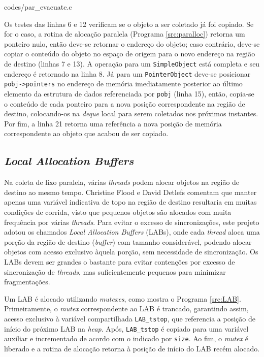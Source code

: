 \documentclass[ccc, pg2]{esinucpel}
\begin{document}

								 {codes/par_evacuate.c}

Os testes das linhas 6 e 12 verificam se o objeto a ser coletado já foi copiado. Se for o caso, a rotina de alocação paralela (Programa \ref{src:paralloc}) retorna um ponteiro nulo, então deve-se retornar o endereço do objeto; caso contrário, deve-se copiar o conteúdo do objeto no espaço de origem para o novo endereço na região de destino (linhas 7 e 13). A operação para um {\tt SimpleObject} está completa e seu endereço é retornado na linha 8. Já para um {\tt PointerObject} deve-se posicionar {\tt pobj->pointers} no endereço de memória imediatamente posterior ao último elemento da estrutura de dados referenciada por {\tt pobj} (linha 15), então, copia-se o conteúdo de cada ponteiro para a nova posição correspondente na região de destino, colocando-os na {\it deque} local para serem coletados nos próximos instantes. Por fim, a linha 21 retorna uma referência a nova posição de memória correspondente ao objeto que acabou de ser copiado.

\subsection{\textit{Local Allocation Buffers}} \label{sec:lab}
Na coleta de lixo paralela, várias {\it threads} podem alocar objetos na região de destino ao mesmo tempo. Christine Flood e David Detlefs \cite{bib:flood:pargc} comentam que manter apenas uma variável indicativa de topo na região de destino resultaria em muitas condições de corrida, visto que pequenos objetos são alocados com muita frequência por várias {\it threads}. Para evitar o excesso de sincronizações, este projeto adotou os chamados {\it Local Allocation Buffers} (LABs), onde cada {\it thread} aloca uma porção da região de destino ({\it buffer}) com tamanho considerável, podendo alocar objetos com acesso exclusivo àquela porção, sem necessidade de sincronização. Os LABs devem ser grandes o bastante para evitar contenções por excesso de sincronização de {\it threads}, mas suficientemente pequenos para minimizar fragmentações.

Um LAB é alocado utilizando {\it mutexes}, como mostra o Programa \ref{src:LAB}. Primeiramente, o {\it mutex} correspondente ao LAB é trancado, garantindo assim, acesso exclusivo à variável compartilhada {\tt LAB\_tstop}, que referencia a posição de início do próximo LAB na {\it heap}. Após, {\tt LAB\_tstop} é copiado para uma variável auxiliar e incrementado de acordo com o indicado por {\tt size}. Ao fim, o {\it mutex} é liberado e a rotina de alocação retorna à posição de início do LAB recém alocado.
\end{document}
